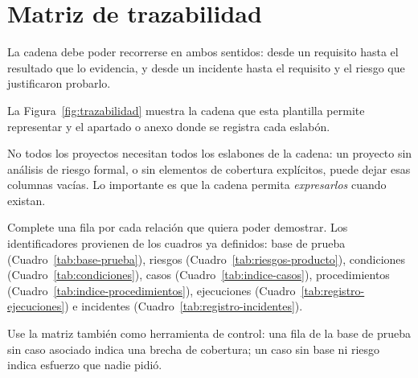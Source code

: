 \section{Matriz de trazabilidad}
\label{anx:trazabilidad}

\begin{notanormativa}
La cadena debe poder recorrerse en ambos sentidos: desde un requisito hasta el resultado que lo
evidencia, y desde un incidente hasta el requisito y el riesgo que justificaron probarlo.
\end{notanormativa}

\begin{observacion}
\end{observacion}

\ifmostrardiagramas


La Figura~\ref{fig:trazabilidad} muestra la cadena que esta plantilla permite representar y el
apartado o anexo donde se registra cada eslabón.
\fi

No todos los proyectos necesitan todos los eslabones de la cadena: un proyecto sin análisis de
riesgo formal, o sin elementos de cobertura explícitos, puede dejar esas columnas vacías. Lo
importante es que la cadena permita \emph{expresarlos} cuando existan.

\begin{instruccion}
Complete una fila por cada relación que quiera poder demostrar. Los identificadores provienen de
los cuadros ya definidos: base de prueba (Cuadro~\ref{tab:base-prueba}), riesgos
(Cuadro~\ref{tab:riesgos-producto}), condiciones (Cuadro~\ref{tab:condiciones}), casos
(Cuadro~\ref{tab:indice-casos}), procedimientos (Cuadro~\ref{tab:indice-procedimientos}),
ejecuciones (Cuadro~\ref{tab:registro-ejecuciones}) e incidentes
(Cuadro~\ref{tab:registro-incidentes}).

Use la matriz también como herramienta de control: una fila de la base de prueba sin caso
asociado indica una brecha de cobertura; un caso sin base ni riesgo indica esfuerzo que nadie
pidió.
\end{instruccion}


